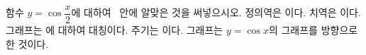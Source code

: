 함수 $y=\cos\dfrac{x}{2}$에 대하여 \blank\ 안에 알맞은 것을 써넣으시오.
 정의역은 \blank[6em]이다.
 치역은 \blank[6em]이다.
 그래프는 \blank[3em]에 대하여 대칭이다.
 주기는 \blank[2.5em]이다.
 그래프는 $y=\cos x$의 그래프를  방향으로  한 것이다.
